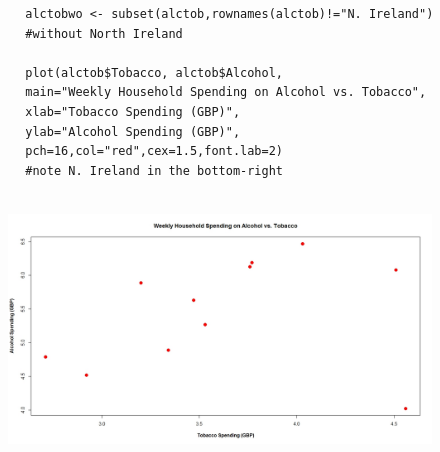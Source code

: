 \documentclass[residuals.tex]{subfiles}
\begin{document}
	
	\begin{framed}
		\begin{verbatim}
		alctobwo <- subset(alctob,rownames(alctob)!="N. Ireland") 
		#without North Ireland
		
		plot(alctob$Tobacco, alctob$Alcohol,
		main="Weekly Household Spending on Alcohol vs. Tobacco",
		xlab="Tobacco Spending (GBP)",
		ylab="Alcohol Spending (GBP)",
		pch=16,col="red",cex=1.5,font.lab=2) 
		#note N. Ireland in the bottom-right
		
		\end{verbatim}	
	\end{framed}
	\begin{figure}
		\centering
		\includegraphics[width=1.3\linewidth]{alcotob}
		\caption{}
		\label{fig:alcotob}
	\end{figure}
	
\end{document}
